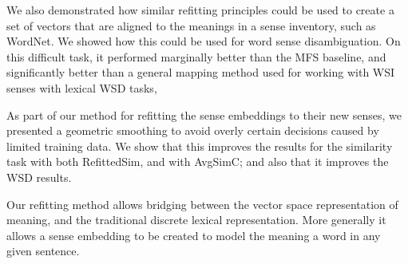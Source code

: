 \documentclass{sig-alternate}
\begin{document}
We also demonstrated how similar refitting principles could be used to create a set of vectors that are aligned to the meanings in a sense inventory, such as WordNet. We showed how this could be used for word sense disambiguation. On this difficult task, it performed marginally better than the MFS baseline, and significantly better than a general mapping method used for working with WSI senses with lexical WSD tasks,

As part of our method for refitting the sense embeddings to their new senses, we presented a geometric smoothing to avoid overly certain decisions caused by limited training data.
We show that this improves the results for the similarity task with both RefittedSim, and with AvgSimC; and also that it improves the WSD results.

Our refitting method allows bridging between the vector space representation of meaning, and the traditional discrete lexical representation. More generally it allows a sense embedding to be created to model the meaning a word in any given sentence.

\newpage
{}
\printbibliography
\end{document}
